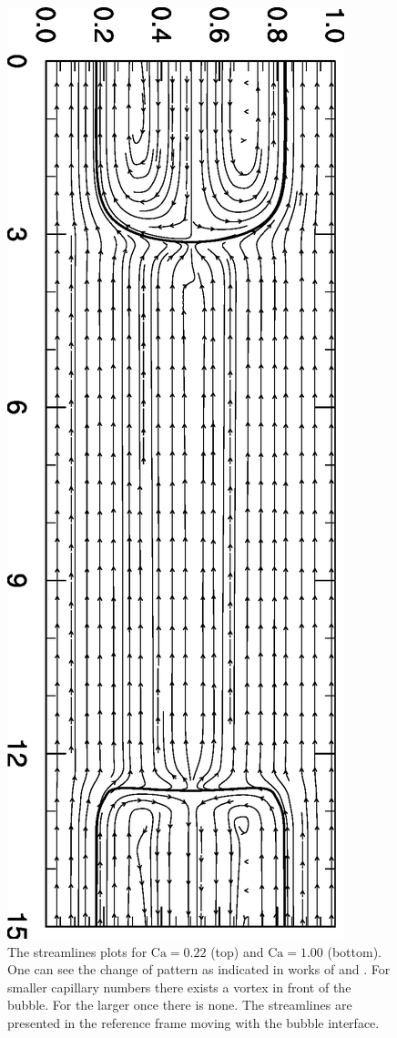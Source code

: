 \documentclass[preprint,12pt]{elsarticle}
\newcommand{\Ca}{\mathrm{Ca}}
\begin{document}
\begin{figure}
\includegraphics[angle=90,width=\textwidth]{Figures/Capillary/ca100_velocity_new.eps}
\caption{The streamlines plots for $\Ca=0.22$ (top) and $\Ca=1.00$ (bottom). One can see the change
of pattern as indicated in works of \citet{heil-bretherton} and \citet{giavedoni-numerical}. For
smaller capillary numbers there exists a vortex in front of the bubble. For the larger once there
is none. The streamlines are presented in the reference frame moving with the bubble
interface.\label{fig:streamlines:pattern}}
\end{figure}
\end{document}
